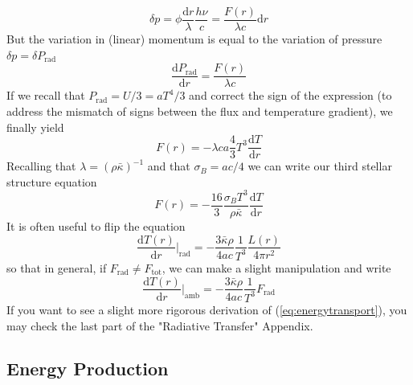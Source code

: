 \begin{equation*}
	\delta p = \phi \frac{\text{d}r}{\lambda}\frac{h\nu}{c} = \frac{F(r)}{\lambda c}\text{d}r
\end{equation*}
But the variation in (linear) momentum is equal to the variation of pressure $\delta p = \delta P_{\text{rad}}$
\begin{equation*}
	\frac{\text{d}P_{\text{rad}}}{\text{d}r} = \frac{F(r)}{\lambda c}
\end{equation*}
If we recall that $P_{\text{rad}} = U/3 = aT^{4}/3$ and correct the sign of the expression (to address the mismatch of signs between the flux and temperature gradient), we finally yield
\begin{equation*}
	F(r) = -\lambda c a \frac{4}{3}T^{3}\frac{\text{d}T}{\text{d}r}
\end{equation*}
Recalling that $\lambda = (\rho\bar{\kappa})^{-1}$ and that $\sigma_{B} = ac/4$ we can write our third stellar structure equation
\begin{equation}
	\boxed{
		F(r) = -\frac{16}{3}\frac{\sigma_{B}T^{3}}{\rho\bar{\kappa}}\frac{\text{d}T}{\text{d}r}
	}
	\label{eq:energytransport}
\end{equation}
It is often useful to flip the equation
\begin{equation*}
	\frac{\text{d}T(r)}{\text{d}r}\Big|_{\text{rad}} = -\frac{3\bar{\kappa}\rho}{4ac}\frac{1}{T^{3}}\frac{L(r)}{4\pi r^{2}}
\end{equation*}
so that in general, if $F_{\text{rad}}\neq F_{\text{tot}}$, we can make a slight manipulation and write
\begin{equation*}
	\frac{\text{d}T(r)}{\text{d}r}\Big|_{\text{amb}} = -\frac{3\bar{\kappa}\rho}{4ac}\frac{1}{T^{3}}F_{\text{rad}}
\end{equation*}
If you want to see a slight more rigorous derivation of (\ref{eq:energytransport}), you may check the last part of the "Radiative Transfer" Appendix.

\subsection{Energy Production}

